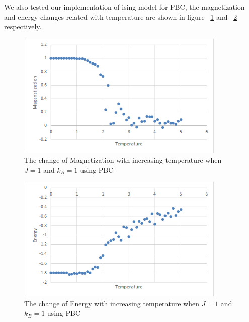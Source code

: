 \documentclass[]{article}
\begin{document}
We also tested our implementation of ising model for PBC, the magnetization and energy changes related with temperature are shown in figure ~\ref{fig:Mag_PBC} and ~\ref{fig:Energy_PBC}  respectively.
\begin{figure}[H]
  \centering
  \includegraphics[width=10cm,height=6cm]{figures/Mag_Temp_PBC}
  \caption{\label{fig:Mag_PBC} The change of Magnetization with increasing temperature when $J=1$ and $k_B=1$ using PBC}
\end{figure}
\begin{figure}[H]
  \centering
  \includegraphics[width=10cm,height=6cm]{figures/Ene_temp_scatter_PBC}
  \caption{\label{fig:Energy_PBC} The change of Energy with increasing temperature when $J=1$ and $k_B=1$ using PBC}
\end{figure}
\end{document}
